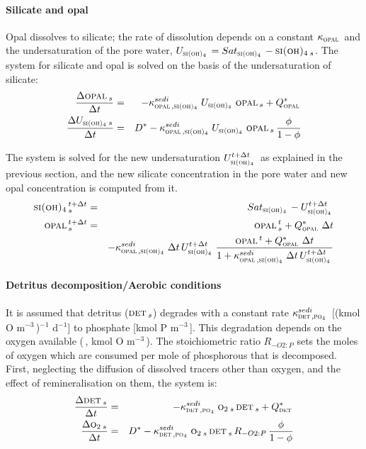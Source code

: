 \documentclass[11pt,a4paper,fleqn,twoside]{article}
\def\pho{\text{\textsc{po$_4$}}\,}
\def\oxy{\text{\textsc{o$_2$}}\,}
\def\sio{\text{\textsc{si(oh)$_4$}}\,}
\def\det{\text{\textsc{det}}\,}
\def\opal{\text{\textsc{opal}}\,}
\newcommand{\concP}{kmol P m$^{-3}$\,}
\newcommand{\concO}{kmol O m$^{-3}$\,}
\begin{document}
\paragraph{Silicate and opal} Opal dissolves to silicate; the rate of
dissolution depends on a constant $\kappa_{\opal}$ and the undersaturation of
the pore water, $U_\sio = Sat_\sio - \sio_s$. The system for silicate and opal
is solved on the basis of the undersaturation of silicate:
\begin{eqnarray}
\frac{\Delta \opal_s}{\Delta t} & = & -\kappa^{sedi}_{\opal,\sio} \, U_\sio \, \opal_s  + Q^*_\opal\label{dglopal_sed}\\
\frac{\Delta U_\sio_s}{\Delta t} & = & D^* - \kappa^{sedi}_{\opal,\sio} \, U_\sio\, \opal_s \, \frac{\phi}{1-\phi}\label{dglsio_sed}
\end{eqnarray}

The system is solved for the new undersaturation $U^{t+\Delta t}_\sio$  as
explained in the previous section, and the new silicate concentration in the
pore water and new opal concentration is computed from it.
\begin{eqnarray}
\sio^{t+\Delta t}_s & = & Sat_\sio - U^{t+\Delta t}_\sio \\
\opal^{t+\Delta t}_s & = & \opal^t_s + Q^*_\opal \, \Delta t \\
&& -\kappa^{sedi}_{\opal,\sio} \, \Delta t \, U^{t+\Delta t}_\sio \, 
\frac{ \opal^{t} + Q^*_\opal \, \Delta t} {1+ \kappa^{sedi}_{\opal,\sio} \,  \Delta t \,
U^{t + \Delta t}_\sio} \nonumber 
\end{eqnarray}

\paragraph{Detritus decomposition/Aerobic conditions} It is assumed that
detritus ($\det_s$) degrades with a constant rate $\kappa^{sedi}_{\det,\pho}$
[(\concO)$^{-1}$ d$^{-1}$] to phosphate [\concP]. This degradation depends on 
the oxygen available (\oxy, \concO). The stoichiometric ratio $R_{-O2:P}$ sets the
moles of oxygen which are consumed per mole of phosphorous that is decomposed. 
First, neglecting the diffusion of dissolved tracers other than oxygen, and 
the effect of remineralisation on them,  the system is:
\begin{eqnarray}
\frac{\Delta \det_s}{\Delta t} & = & -\kappa^{sedi}_{\det,\pho} \, \oxy_s \, \det_s  + Q^*_\det\label{dglpop}\\
\frac{\Delta \oxy_s}{\Delta t} & = & D^* - \kappa^{sedi}_{\det,\pho} \, \oxy_s \, \det_s  \, R_{-O2:P} \, \frac{\phi}{1-\phi}\label{dglox}
\end{eqnarray}
\end{document}
